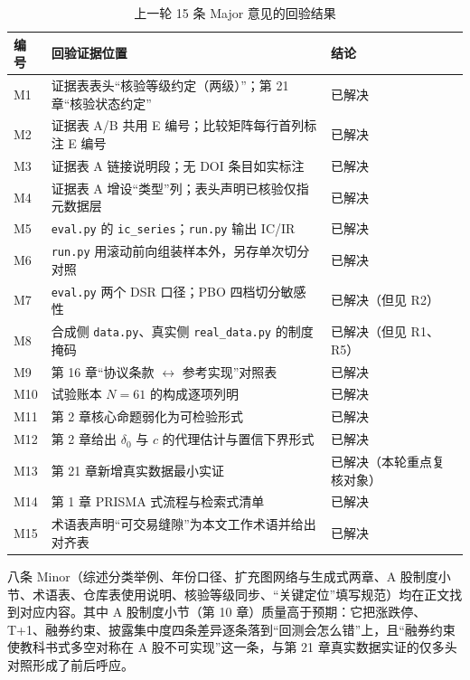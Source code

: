\documentclass[11pt,a4paper]{ctexart}
\begin{document}
\begin{table}[htbp]
\centering
\caption{上一轮 15 条 Major 意见的回验结果}
\label{tab:major}
\begin{tabular}{@{}>{\raggedright\arraybackslash}p{0.9cm}>{\raggedright\arraybackslash}p{5.6cm}>{\raggedright\arraybackslash}p{6.3cm}@{}}
\toprule
编号 & 回验证据位置 & 结论 \\
\midrule
M1 & 证据表表头“核验等级约定（两级）”；第 21 章“核验状态约定” & 已解决 \\
M2 & 证据表 A/B 共用 E 编号；比较矩阵每行首列标注 E 编号 & 已解决 \\
M3 & 证据表 A 链接说明段；无 DOI 条目如实标注 & 已解决 \\
M4 & 证据表 A 增设“类型”列；表头声明已核验仅指元数据层 & 已解决 \\
M5 & \texttt{eval.py} 的 \texttt{ic\_series}；\texttt{run.py} 输出 IC/IR & 已解决 \\
M6 & \texttt{run.py} 用滚动前向组装样本外，另存单次切分对照 & 已解决 \\
M7 & \texttt{eval.py} 两个 DSR 口径；PBO 四档切分敏感性 & 已解决（但见 R2） \\
M8 & 合成侧 \texttt{data.py}、真实侧 \texttt{real\_data.py} 的制度掩码 & 已解决（但见 R1、R5） \\
M9 & 第 16 章“协议条款 $\leftrightarrow$ 参考实现”对照表 & 已解决 \\
M10 & 试验账本 $N=61$ 的构成逐项列明 & 已解决 \\
M11 & 第 2 章核心命题弱化为可检验形式 & 已解决 \\
M12 & 第 2 章给出 $\delta_0$ 与 $c$ 的代理估计与置信下界形式 & 已解决 \\
M13 & 第 21 章新增真实数据最小实证 & 已解决（本轮重点复核对象） \\
M14 & 第 1 章 PRISMA 式流程与检索式清单 & 已解决 \\
M15 & 术语表声明“可交易缝隙”为本文工作术语并给出对齐表 & 已解决 \\
\bottomrule
\end{tabular}
\end{table}

八条 Minor（综述分类举例、年份口径、扩充图网络与生成式两章、A 股制度小节、术语表、仓库表使用说明、核验等级同步、“关键定位”填写规范）均在正文找到对应内容。其中 A 股制度小节（第 10 章）质量高于预期：它把涨跌停、T+1、融券约束、披露集中度四条差异逐条落到“回测会怎么错”上，且“融券约束使教科书式多空对称在 A 股不可实现”这一条，与第 21 章真实数据实证的仅多头对照形成了前后呼应。
\end{document}
